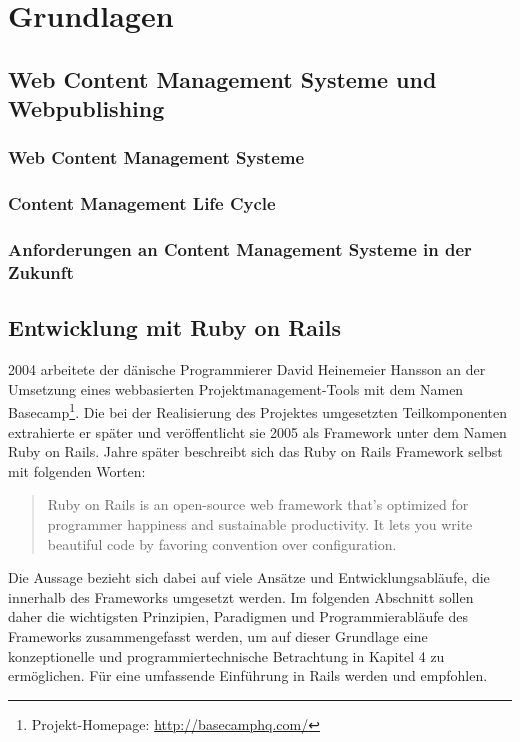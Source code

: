 \chapter{Grundlagen}

\section{Web Content Management Systeme und Webpublishing}
\subsection{Web Content Management Systeme}
\subsection{Content Management Life Cycle}
\subsection{Anforderungen an Content Management Systeme in der Zukunft}


\section{Entwicklung mit Ruby on Rails}

2004 arbeitete der dänische Programmierer David Heinemeier Hansson an der Umsetzung eines webbasierten Projektmanagement-Tools mit dem Namen Basecamp\footnote{Projekt-Homepage: \href{http://basecamphq.com/}{http://basecamphq.com/}}. Die bei der Realisierung des Projektes umgesetzten Teilkomponenten extrahierte er später und veröffentlicht sie 2005 als Framework unter dem Namen Ruby on Rails.
\newline
{} Jahre später beschreibt sich das Ruby on Rails Framework selbst mit folgenden Worten:
\begin{quote}
Ruby on Rails is an open-source web framework that’s
optimized for programmer happiness and sustainable
productivity. It lets you write beautiful code by
favoring convention over configuration.
\end{quote}

Die Aussage bezieht sich dabei auf viele Ansätze und Entwicklungsabläufe, die innerhalb des Frameworks umgesetzt werden.
Im folgenden Abschnitt sollen daher die wichtigsten Prinzipien, Paradigmen und Programmierabläufe des Frameworks zusammengefasst werden, um auf dieser Grundlage eine konzeptionelle und programmiertechnische Betrachtung in Kapitel 4 zu ermöglichen.
\newline
\newline
Für eine umfassende Einführung in Rails werden \cite{RubyMetaprogramming2010} und \cite{EnterpriseRails} empfohlen.

